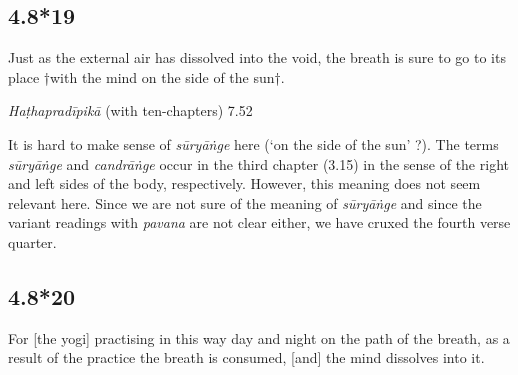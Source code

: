\begin{ekdosis}

\subsection*{4.8*19}
\begin{translation}[hp04_008_19]
Just as the external air has dissolved into the void, the breath is sure to go to its place †with the mind on the side of the sun†.
\end{translation}


\begin{testimonia}[hp04_008_19]
\emph{Haṭhapradīpikā} (with ten-chapters) 7.52 
\begin{versinnote}
\end{versinnote}
\end{testimonia}

\begin{philcomm}[hp04_008_19]
It is hard to make sense of \emph{sūryāṅge} here (`on the side of the sun' ?). The terms \emph{sūryāṅge} and \emph{candrāṅge} occur in the third chapter (3.15) in the sense of the right and left sides of the body, respectively. However, this meaning does not seem relevant here. Since we are not sure of the meaning of \emph{sūryāṅge} and since the variant readings with \emph{pavana} are not clear either, we have cruxed the fourth verse quarter.      
\end{philcomm}

%

\subsection*{4.8*20}
\begin{translation}[hp04_008_20]
For [the yogi] practising in this way day and night on the path of the breath, as a result of the practice the breath is consumed, [and] the mind dissolves into it.
\end{translation}


\end{ekdosis}
